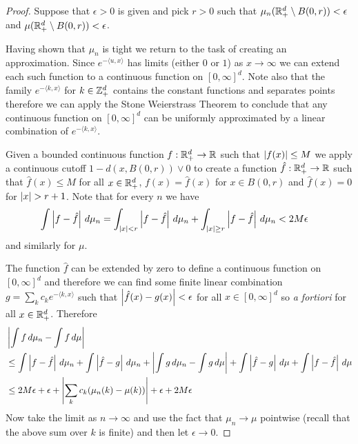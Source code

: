 \begin{proof}
Suppose that $\epsilon > 0$ is given and
pick $r > 0$ such that $\mu_n(\mathbb{R}^d_+ \setminus B(0, r)) <
\epsilon$ and $\mu(\mathbb{R}^d_+ \setminus B(0, r)) < \epsilon$.

Having shown that $\mu_n$ is tight we return to the task of creating
an approximation.  Since $e^{-\langle u,x \rangle}$
has limits (either $0$ or $1$) as $x \to \infty$ we can extend each
such function to
a continuous function on $[0,\infty]^d$.  Note also that the family $e^{-\langle k, x
  \rangle}$ for $k \in \mathbb{Z}^d_+$ contains the constant functions
and separates points therefore we can apply the Stone Weierstrass
Theorem to conclude that any
continuous function on $[0,\infty]^d$ can be uniformly approximated by
a linear combination of $e^{-\langle k, x  \rangle}$. 

Given a bounded continuous function $f : \mathbb{R}^d_+ \to \mathbb{R}$ such
that $\left \vert f(x) \right \vert \leq M$ we
apply a continuous cutoff $1 - d(x,B(0,r)) \vee 0$ to create a function $\hat{f} : \mathbb{R}^d_+
\to \mathbb{R}$ such that $\hat{f}(x) \leq M$ for all $x \in \mathbb{R}^d_+$, $f(x) = \hat{f}(x)$ for $x \in B(0,r)$ and
$\hat{f}(x) = 0$ for $\left \vert x \right \vert > r+1$.  Note that for every $n$ we have
\begin{align*}
\int \left \vert f - \hat{f} \right \vert \, d\mu_n &= 
\int_{\left \vert x \right \vert < r} \left \vert f -  \hat{f} \right \vert \, d\mu_n + 
\int_{\left \vert x \right \vert \geq r} \left \vert f -  \hat{f} \right \vert \, d\mu_n < 2 M \epsilon
\end{align*}
and similarly for $\mu$.

The function $\hat{f}$ can be
extended by zero to define a continuous function on $[0,\infty]^d$ and
therefore we can find some finite linear combination $g = \sum_k c_k
e^{-\langle k, x \rangle}$ such that $\left \vert \hat{f}(x) - g(x) \right \vert<
\epsilon$ for all $x \in [0, \infty]^d$ so \emph{a fortiori} for all $x \in \mathbb{R}^d_+$.  Therefore
\begin{align*}
&\left \vert \int f \, d\mu_n - \int f \, d \mu \right \vert \\
&\leq \int \left \vert f - \hat{f} \right \vert
\, d\mu_n + \int \left \vert \hat{f} - g \right \vert\, d\mu_n + \left \vert \int  g\, d\mu_n -
  \int g \, d\mu \right \vert + \int \left \vert \hat{f} - g \right \vert\, d\mu + \int \left \vert f - \hat{f} \right \vert
\, d\mu \\
&\leq 2M \epsilon + \epsilon + \left \vert \sum_k c_k ( \mu_n(k) - \mu(k)) \right \vert +
\epsilon + 2M \epsilon
\end{align*}
Now take the limit as $n \to \infty$ and use the fact that $\mu_n \to
\mu$ pointwise (recall that the above sum
over $k$ is finite) and then let $\epsilon \to 0$.
\end{proof}

